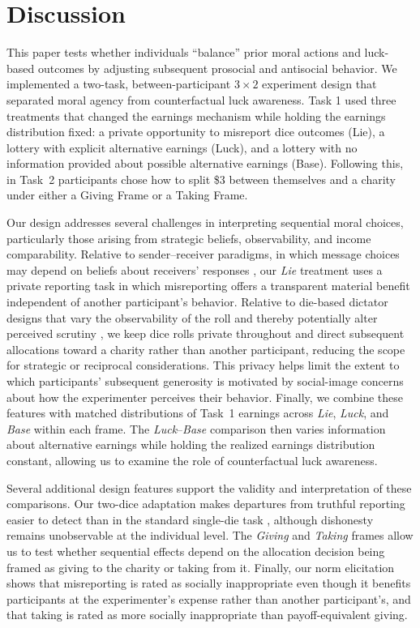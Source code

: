 \documentclass{article}
\begin{document}
\section{Discussion} \label{discussion}

This paper tests whether individuals ``balance'' prior moral actions and luck-based outcomes by adjusting subsequent prosocial and antisocial behavior. We implemented a two-task, between-participant $3\times2$ experiment design that separated moral agency from counterfactual luck awareness. Task 1 used three treatments that changed the earnings mechanism while holding the earnings distribution fixed: a private opportunity to misreport dice outcomes (Lie), a lottery with explicit alternative earnings (Luck), and a lottery with no information provided about possible alternative earnings (Base). Following this, in Task~2 participants chose how to split \$3 between themselves and a charity under either a Giving Frame or a Taking Frame.
\par
Our design addresses several challenges in interpreting sequential moral choices, particularly those arising from strategic beliefs, observability, and income comparability. Relative to sender--receiver paradigms, in which message choices may depend on beliefs about receivers' responses \parencite{Gneezy2014,Sutter2009,Vanberg2016}, our \textit{Lie} treatment uses a private reporting task in which misreporting offers a transparent material benefit independent of another participant's behavior. Relative to die-based dictator designs that vary the observability of the roll and thereby potentially alter perceived scrutiny \parencite{Ploner2013}, we keep dice rolls private throughout and direct subsequent allocations toward a charity rather than another participant, reducing the scope for strategic or reciprocal considerations. This privacy helps limit the extent to which participants' subsequent generosity is motivated by social-image concerns about how the experimenter perceives their behavior. Finally, we combine these features with matched distributions of Task~1 earnings across \textit{Lie}, \textit{Luck}, and \textit{Base} within each frame. The \textit{Luck}--\textit{Base} comparison then varies information about alternative earnings while holding the realized earnings distribution constant, allowing us to examine the role of counterfactual luck awareness.
\par
Several additional design features support the validity and interpretation of these comparisons. Our two-dice adaptation makes departures from truthful reporting easier to detect than in the standard single-die task \parencite{Fischbacher2013}, although dishonesty remains unobservable at the individual level. The \textit{Giving} and \textit{Taking} frames allow us to test whether sequential effects depend on the allocation decision being framed as giving to the charity or taking from it. Finally, our norm elicitation shows that misreporting is rated as socially inappropriate even though it benefits participants at the experimenter's expense rather than another participant's, and that taking is rated as more socially inappropriate than payoff-equivalent giving.
\end{document}
